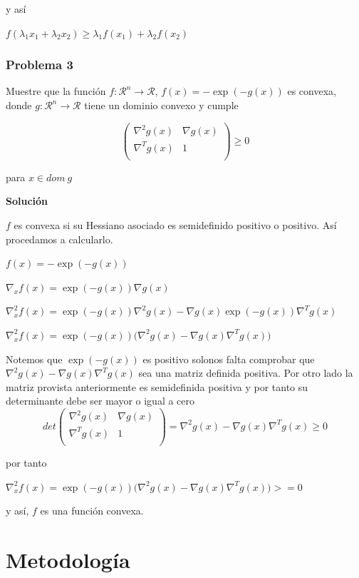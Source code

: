 \documentclass[journal]{IEEEtran}
\begin{document}
y así

$f(\lambda_1x_1 + \lambda_2x_2) \ge \lambda_1 f(x_1)+ \lambda_2f(x_2)$

\subsubsection{Problema 3}

Muestre que la función $f:\mathcal{R}^n \rightarrow \mathcal{R}$, $f(x) = -\exp(-g(x))$ es convexa, donde $g:\mathcal{R}^n \rightarrow \mathcal{R}$ tiene un dominio convexo y cumple

$$
\begin{pmatrix}
	\nabla^2g(x) & \nabla g(x)\\
	\nabla ^ T g(x) & 1\\
\end{pmatrix} \ge 0
$$

para $x \in dom\ g$

\textbf{Solución}

$f$ es convexa si su Hessiano asociado es semidefinido positivo o positivo. Así procedamos a calcularlo.

$ f(x) = -\exp(-g(x)) $

$ \nabla_xf(x) = \exp(-g(x)) \nabla g(x) $

$ \nabla_x^2 f(x) = \exp(-g(x)) \nabla^2 g(x) - \nabla g(x) \exp(-g(x)) \nabla^T g(x) $

$ \nabla_x^2 f(x) = \exp(-g(x)) \Big (\nabla^2 g(x) - \nabla g(x) \nabla^T g(x) \Big) $

Notemos que $\exp(-g(x))$ es positivo solonos falta comprobar que $\nabla^2 g(x) - \nabla g(x) \nabla^T g(x)$ sea una matriz definida positiva. Por otro lado la matriz provista anteriormente es semidefinida positiva y por tanto su determinante debe ser mayor o igual a cero
$$
det \begin{pmatrix}
	\nabla^2g(x) & \nabla g(x)\\
	\nabla ^ T g(x) & 1\\
\end{pmatrix} = \nabla^2g(x) - \nabla g(x) \nabla ^ T g(x) \ge 0
$$

por tanto

$ \nabla_x^2 f(x) = \exp(-g(x)) \big (\nabla^2 g(x) - \nabla g(x) \nabla^T g(x) \big) >=0 $

y así, $f$ es una función convexa.

\section{Metodología}
\end{document}
